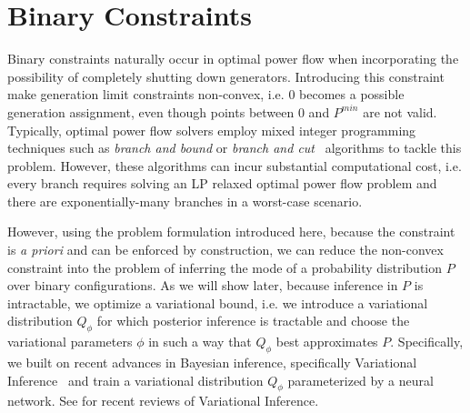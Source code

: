 \section{Binary Constraints}
\label{sec:bin_contraints}
Binary constraints naturally occur in optimal power flow when incorporating the possibility of completely shutting down generators. Introducing this constraint make generation limit constraints non-convex, i.e. $0$ becomes a possible generation assignment, even though points between $0$ and $P^{min}$ are not valid. Typically, optimal power flow solvers employ mixed integer programming techniques such as \emph{branch and bound} or \emph{branch and cut}~\cite{lawler1966branch} algorithms to tackle this problem. However, these algorithms can incur substantial computational cost, i.e. every branch requires solving an LP relaxed optimal power flow problem and there are exponentially-many branches in a worst-case scenario.

However, using the problem formulation introduced here, because the constraint is \emph{a priori} and can be enforced by construction, we can reduce the non-convex constraint into the problem of inferring the mode of a probability distribution $P$ over binary configurations. As we will show later, because inference in $P$ is intractable, we optimize a variational bound, i.e. we introduce a variational distribution $Q_\phi$ for which posterior inference is tractable and choose the variational parameters $\phi$ in such a way that $Q_\phi$ best approximates $P$. Specifically, we built on recent advances in Bayesian inference, specifically Variational Inference~\cite{wainwright2008graphical} and train a variational distribution $Q_\phi$ parameterized by a neural network. See \cite{blei2017variational,zhang2017advances} for recent reviews of Variational Inference.

